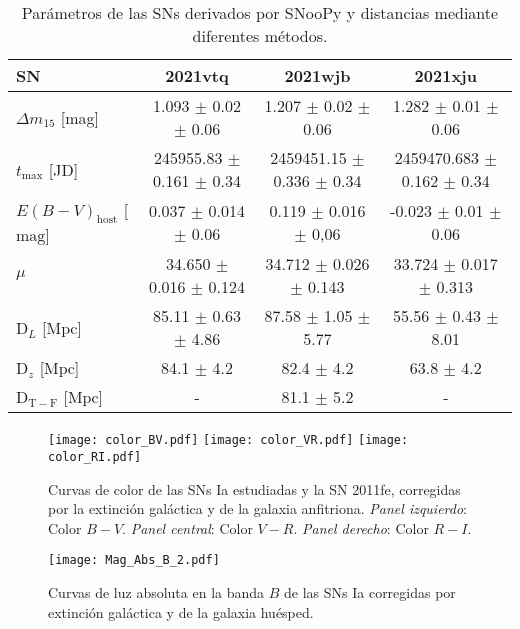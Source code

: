 \documentclass[baaa]{baaa}
\begin{document}
\begin{table*}[t]
\centering
\fontsize{9}{10}\selectfont
\caption{Parámetros de las SNs derivados por {\sc SNooPy} y distancias mediante diferentes métodos.}
\begin{tabular}{lccc}
\hline\hline\noalign{\smallskip}
SN                 & 2021vtq                    & 2021wjb                     & 2021xju                      \\ \hline
$\Delta m_{15}$ [mag]    & 1.093 $\pm$ 0.02 $\pm$ 0.06      & 1.207 $\pm$ 0.02 $\pm$ 0.06       & 1.282 $\pm$ 0.01 $\pm$ 0.06        \\
$t_\mathrm{max}$ [JD]            & 245955.83 $\pm$ 0.161 $\pm$ 0.34 & 2459451.15 $\pm$ 0.336 $\pm$ 0.34 & 2459470.683 $\pm$ 0.162 $\pm$ 0.34 \\
$E(B-V)_\mathrm{host}$ [$\mathrm{mag}$]            & 0.037 $\pm$ 0.014 $\pm$ 0.06     & 0.119 $\pm$ 0.016 $\pm$ 0,06      & -0.023 $\pm$ 0.01 $\pm$ 0.06       \\
$\mu$ & 34.650 $\pm$ 0.016 $\pm$ 0.124   & 34.712 $\pm$ 0.026 $\pm$ 0.143    & 33.724 $\pm$ 0.017 $\pm$ 0.313     \\
D$_L$ [$\mathrm{Mpc}$]               & 85.11 $\pm$ 0.63 $\pm$ 4.86      & 87.58 $\pm$ 1.05 $\pm$ 5.77       & 55.56 $\pm$ 0.43 $\pm$ 8.01        \\
D$_z$ [$\mathrm{Mpc}$]              & 84.1 $\pm$ 4.2                & 82.4 $\pm$ 4.2                 & 63.8 $\pm$ 4.2                  \\
D$_\mathrm{T-F}$ [$\mathrm{Mpc}$]             & -                          & 81.1 $\pm$ 5.2                 & -                            \\
\hline
\end{tabular}
\label{t:distancias}
\end{table*}



\begin{figure*}[t]
 \centering
   \label{f:vtq}
    \texttt{[image: color\_BV.pdf]}
   \label{f:wjb}
    \texttt{[image: color\_VR.pdf]}
       \label{f:wjb}
    \texttt{[image: color\_RI.pdf]}
 \caption{Curvas de color de las SNs Ia estudiadas y la SN 2011fe, corregidas por la extinción galáctica y de la galaxia anfitriona. {\em Panel izquierdo}: Color $B-V$. {\em Panel central}: Color $V-R$. {\em Panel derecho}: Color $R-I$. }
 \label{f:colores.SNs}
\end{figure*}


\begin{figure}[t]
 \centering
   \label{f:vtq}
    \texttt{[image: Mag\_Abs\_B\_2.pdf]}
 \caption{Curvas de luz absoluta en la banda $B$  de las SNs Ia corregidas por extinción galáctica y de la galaxia huésped.}
 \label{f:LC.abs}
\end{figure}
\end{document}
